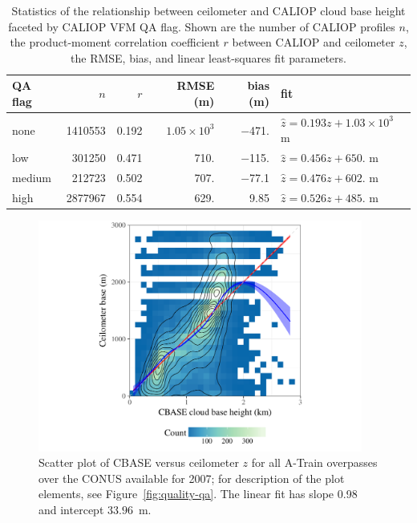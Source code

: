 \documentclass[essd,manuscript]{copernicus}\usepackage[]{graphicx}\usepackage[]{color}
\newenvironment{knitrout}{}{} %
\newcommand\CBH{\ensuremath{z}}
\begin{document}
\begin{table}
  \centering
  \caption{Statistics of the relationship between ceilometer and CALIOP cloud
    base height faceted by CALIOP VFM QA flag.  Shown are the number of CALIOP
    profiles $n$, the product-moment correlation coefficient $r$ between CALIOP
    and ceilometer \CBH{}, the RMSE, bias, and linear least-squares
    fit parameters.}
  \label{tab:quality-qa}
\begin{tabular}{lrrrrl}
  \hline
\hline
QA flag & $n$ & $r$ & RMSE (m) & bias (m) & fit \\ 
  \hline
none & 1410553 & 0.192 & $1.05 \times 10^{3}$ & $-$471. & $\hat{z} = 0.193 z + \ensuremath{1.03 \times 10^{3}}$ m \\ 
  low & 301250 & 0.471 & 710. & $-$115. & $\hat{z} = 0.456 z + 650.$ m \\ 
  medium & 212723 & 0.502 & 707. & $-$77.1 & $\hat{z} = 0.476 z + 602.$ m \\ 
  high & 2877967 & 0.554 & 629. & 9.85 & $\hat{z} = 0.526 z + 485.$ m \\ 
   \hline
\hline
\end{tabular}

\end{table}

\begin{figure}
  \centering
\begin{knitrout}
\color{fgcolor}

{\centering \includegraphics[width=0.95\textwidth]{figure/method-combo-plot-1} 

}



\end{knitrout}
  \caption{Scatter plot of CBASE versus ceilometer \CBH{} for all A-Train
    overpasses over the CONUS available for 2007; for description of the
  plot elements, see Figure~\ref{fig:quality-qa}.  The linear fit has slope
  0.98 and intercept $33.96$~m.}
  \label{fig:eval}
\end{figure}
\end{document}
